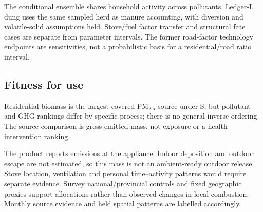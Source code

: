 The conditional ensemble shares household activity across pollutants. Ledger-L dung uses the same sampled herd as manure accounting, with diversion and volatile-solid assumptions held. Stove/fuel factor transfer and structural fate cases are separate from parameter intervals. The former road-factor technology endpoints are sensitivities, not a probabilistic basis for a residential/road ratio interval.

\subsection{Fitness for use}
Residential biomass is the largest covered PM$_{2.5}$ source under S, but pollutant and GHG rankings differ by specific process; there is no general inverse ordering. The source comparison is gross emitted mass, not exposure or a health-intervention ranking.

The product reports emissions at the appliance. Indoor deposition and outdoor escape are not estimated, so this mass is not an ambient-ready outdoor release. Stove location, ventilation and personal time--activity patterns would require separate evidence. Survey national/provincial controls and fixed geographic proxies support allocations rather than observed changes in local combustion. Monthly source evidence and held spatial patterns are labelled accordingly.
